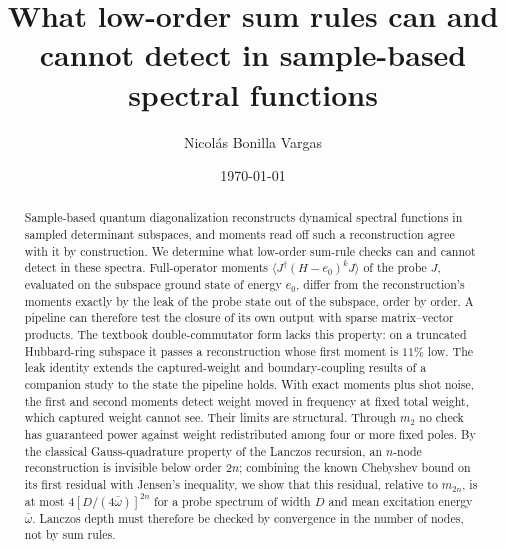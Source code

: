 \documentclass[aps,prb,reprint,onecolumn,12pt,superscriptaddress,longbibliography,floatfix]{revtex4-2}
\begin{document}
\title{What low-order sum rules can and cannot detect in sample-based spectral functions}

\author{Nicol\'as Bonilla Vargas}
\ifdefined\JPCM{}\else{}\fi
{}

\date{\today}

\begin{abstract}
Sample-based quantum diagonalization reconstructs dynamical spectral functions in sampled determinant subspaces, and moments read off such a reconstruction agree with it by construction. We determine what low-order sum-rule checks can and cannot detect in these spectra. Full-operator moments $\langle J^\dagger(H-e_0)^kJ\rangle$ of the probe $J$, evaluated on the subspace ground state of energy $e_0$, differ from the reconstruction's moments exactly by the leak of the probe state out of the subspace, order by order. A pipeline can therefore test the closure of its own output with sparse matrix--vector products. The textbook double-commutator form lacks this property: on a truncated Hubbard-ring subspace it passes a reconstruction whose first moment is $11\%$ low. The leak identity extends the captured-weight and boundary-coupling results of a companion study to the state the pipeline holds. With exact moments plus shot noise, the first and second moments detect weight moved in frequency at fixed total weight, which captured weight cannot see. Their limits are structural. Through $m_2$ no check has guaranteed power against weight redistributed among four or more fixed poles. By the classical Gauss-quadrature property of the Lanczos recursion, an $n$-node reconstruction is invisible below order $2n$; combining the known Chebyshev bound on its first residual with Jensen's inequality, we show that this residual, relative to $m_{2n}$, is at most $4[D/(4\bar\omega)]^{2n}$ for a probe spectrum of width $D$ and mean excitation energy $\bar\omega$. Lanczos depth must therefore be checked by convergence in the number of nodes, not by sum rules.
\end{abstract}

\maketitle

\end{document}
